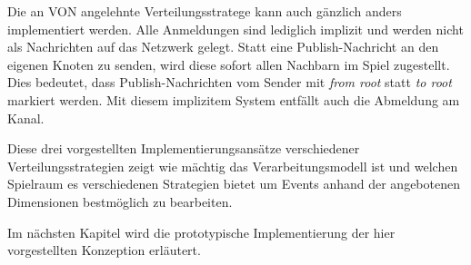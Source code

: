 Die an VON angelehnte Verteilungsstratege kann auch gänzlich anders implementiert werden. Alle Anmeldungen sind lediglich implizit und werden nicht als Nachrichten auf das Netzwerk gelegt. Statt eine Publish-Nachricht an den eigenen Knoten zu senden, wird diese sofort allen Nachbarn im Spiel zugestellt. Dies bedeutet, dass Publish-Nachrichten vom Sender mit \emph{from root} statt \emph{to root} markiert werden. Mit diesem implizitem System entfällt auch die Abmeldung am Kanal.

Diese drei vorgestellten Implementierungsansätze verschiedener Verteilungsstrategien zeigt wie mächtig das Verarbeitungsmodell ist und welchen Spielraum es verschiedenen Strategien bietet um Events anhand der angebotenen Dimensionen bestmöglich zu bearbeiten.

Im nächsten Kapitel wird die prototypische Implementierung der hier vorgestellten Konzeption erläutert.
